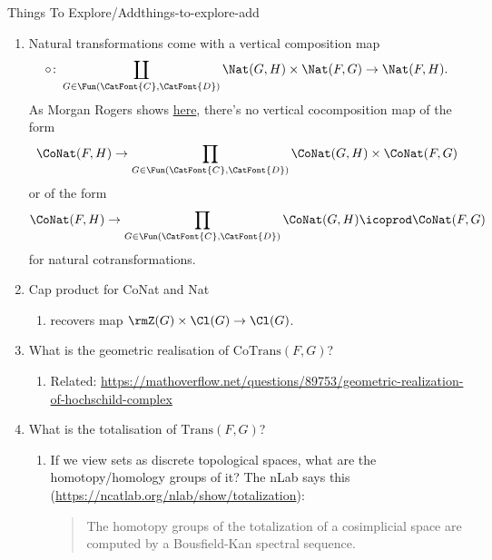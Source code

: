 \begin{remark}{Things To Explore/Add}{things-to-explore-add}
\begin{enumerate}
\begin{enumerate}
                \item Natural transformations come with a vertical composition map
                    \[
                        \circ%
                        \colon%
                        \coprod_{G\in\Fun(\CatFont{C},\CatFont{D})}\Nat(G,H)\times\Nat(F,G)%
                        \to%
                        \Nat(F,H).%
                    \]%
                    As Morgan Rogers shows \href{https://categorytheory.zulipchat.com/#narrow/stream/229136-theory.3A-category-theory/topic/.E2.80.9CNatural.20cotransformations.E2.80.9D/near/436863628}{here}, there's no vertical cocomposition map of the form
                    \[
                        \CoNat(F,H)%
                        \to%
                        \prod_{G\in\Fun(\CatFont{C},\CatFont{D})}\CoNat(G,H)\times\CoNat(F,G)%
                    \]%
                    or of the form
                    \[
                        \CoNat(F,H)%
                        \to%
                        \prod_{G\in\Fun(\CatFont{C},\CatFont{D})}\CoNat(G,H)\icoprod\CoNat(F,G)%
                    \]%
                    for natural cotransformations.
                \item Cap product for CoNat and Nat
                    \begin{enumerate}
                        \item recovers map $\rmZ(G)\times\Cl(G)\to\Cl(G)$.
                    \end{enumerate}
                \item What is the geometric realisation of $\mathrm{CoTrans}(F,G)$?
                    \begin{enumerate}
                        \item Related: \url{https://mathoverflow.net/questions/89753/geometric-realization-of-hochschild-complex}
                    \end{enumerate}
                \item What is the totalisation of $\mathrm{Trans}(F,G)$?
                    \begin{enumerate}
                        \item If we view sets as discrete topological spaces, what are the homotopy/homology groups of it? The nLab says this (\url{https://ncatlab.org/nlab/show/totalization}):
                            \begin{quote}
                                The homotopy groups of the totalization of a cosimplicial space are computed by a Bousfield-Kan spectral sequence.


\end{quote}
\end{enumerate}
\end{enumerate}
\end{enumerate}
\end{remark}
